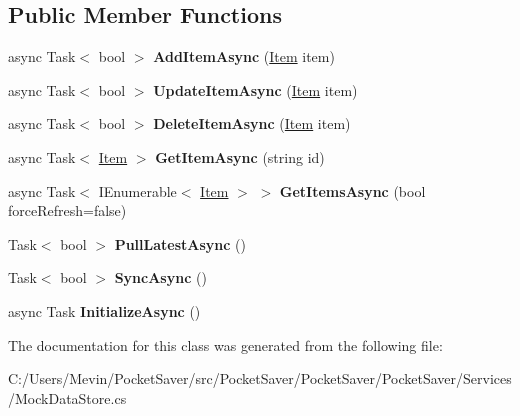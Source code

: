\subsection*{Public Member Functions}
\begin{DoxyCompactItemize}
\item 
\mbox{\label{class_pocket_saver_1_1_services_1_1_mock_data_store_a7d4b90a0525f662b848d4422bcaefebe}} 
async Task$<$ bool $>$ {\bfseries Add\+Item\+Async} (\hyperlink{class_pocket_saver_1_1_models_1_1_item}{Item} item)
\item 
\mbox{\label{class_pocket_saver_1_1_services_1_1_mock_data_store_aadbfa26922ac219215a944975152190e}} 
async Task$<$ bool $>$ {\bfseries Update\+Item\+Async} (\hyperlink{class_pocket_saver_1_1_models_1_1_item}{Item} item)
\item 
\mbox{\label{class_pocket_saver_1_1_services_1_1_mock_data_store_ab0c404abbd057446da4095dc4e4abc12}} 
async Task$<$ bool $>$ {\bfseries Delete\+Item\+Async} (\hyperlink{class_pocket_saver_1_1_models_1_1_item}{Item} item)
\item 
\mbox{\label{class_pocket_saver_1_1_services_1_1_mock_data_store_ae68f480735063a93fbf5507da853077b}} 
async Task$<$ \hyperlink{class_pocket_saver_1_1_models_1_1_item}{Item} $>$ {\bfseries Get\+Item\+Async} (string id)
\item 
\mbox{\label{class_pocket_saver_1_1_services_1_1_mock_data_store_a3a8300821f4859edbb51b01652183646}} 
async Task$<$ I\+Enumerable$<$ \hyperlink{class_pocket_saver_1_1_models_1_1_item}{Item} $>$ $>$ {\bfseries Get\+Items\+Async} (bool force\+Refresh=false)
\item 
\mbox{\label{class_pocket_saver_1_1_services_1_1_mock_data_store_ac639240fa454cbdd00db0db7f01fe136}} 
Task$<$ bool $>$ {\bfseries Pull\+Latest\+Async} ()
\item 
\mbox{\label{class_pocket_saver_1_1_services_1_1_mock_data_store_a5a44b3150c7308915990c5411f3afbfe}} 
Task$<$ bool $>$ {\bfseries Sync\+Async} ()
\item 
\mbox{\label{class_pocket_saver_1_1_services_1_1_mock_data_store_aebef6f70f2548f3e703abfb65f46f16e}} 
async Task {\bfseries Initialize\+Async} ()
\end{DoxyCompactItemize}


The documentation for this class was generated from the following file\+:\begin{DoxyCompactItemize}
\item 
C\+:/\+Users/\+Mevin/\+Pocket\+Saver/src/\+Pocket\+Saver/\+Pocket\+Saver/\+Pocket\+Saver/\+Services/Mock\+Data\+Store.\+cs\end{DoxyCompactItemize}
